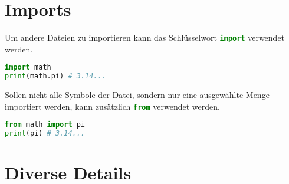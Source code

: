 \documentclass[columns=3]{cheatsheet}
\begin{document}
\section{Imports}
Um andere Dateien zu importieren kann das Schlüsselwort \lstinline[language=python]{import} verwendet werden.
\begin{lstlisting}[language=python]
import math
print(math.pi) # 3.14...
\end{lstlisting}
Sollen nicht alle Symbole der Datei, sondern nur eine ausgewählte Menge importiert werden, kann zusätzlich
\lstinline[language=python]{from} verwendet werden.
\begin{lstlisting}[language=python]
from math import pi
print(pi) # 3.14...
\end{lstlisting}

\section{Diverse Details}
\end{document}
